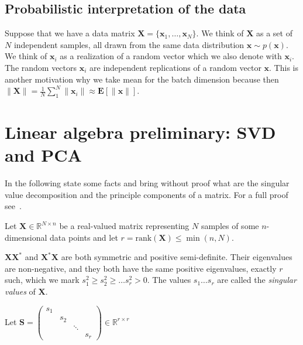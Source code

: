 \documentclass[11pt, a4paper]{report}
\theoremstyle{plain}
\theoremstyle{definition}
\theoremstyle{remark}
\newcommand{\R}{\mathbb{R}}
\newcommand{\E}{\mathbf{E}}
\newcommand{\X}{\mathbf{X}}
\newcommand{\x}{\mathbf{x}}
\newcommand{\Y}{\mathbf{Y}}
\newcommand{\bv}[1]{\boldsymbol{#1}}
\newcommand{\gt}{>}
\begin{document}


\subsection{Probabilistic interpretation of the data}
Suppose that we have a data matrix $\X = \{\x_1, \dots , \x_N\}$.
We think of $\X$ as a set of $N$ independent samples, all drawn from the same
data distribution $\x \sim p(\x)$. We think of $\x_i$ as a realization of a
random vector which we also denote with $\x_i$. 
The random vectors $\x_i$ are independent replications of a random vector $\x$.
This is another motivation why we take mean for the batch dimension because
then $\|\X\| = \frac{1}{N} \sum_1^N \|\x_i\| \approx \E [\|\x\|]$.


\section{Linear algebra preliminary: SVD and PCA}
In the following state some facts and bring without proof what are the singular
value decomposition and the principle components of a matrix. For a
full proof see~\cite{serre2001matrices}.

Let $\bv{X} \in \R^{N \times n}$ be a real-valued matrix
representing $N$ samples of some
$n$-dimensional data points and let
$r= \text{rank}(\bv{X}) \leq \min(n,N)$. 

$\X \X^*$ and $\X^* \X$ are both symmetric and positive semi-definite.
Their eigenvalues are non-negative, and they both have
the same positive 
eigenvalues, exactly $r$ such, which we mark
$s_1^2 \geq s_2^2 \geq \dots s_r^2 \gt 0$. The values
$s_1 \dots s_r$ are called the \emph{singular values} of $\bv{X}$.

Let $\bv{S} = 
\begin{pmatrix}
s_1 & & &\\
& s_2 & &\\
& & \ddots &\\
& & & s_r
\end{pmatrix} \in \R^{r \times r}
$
\end{document}

